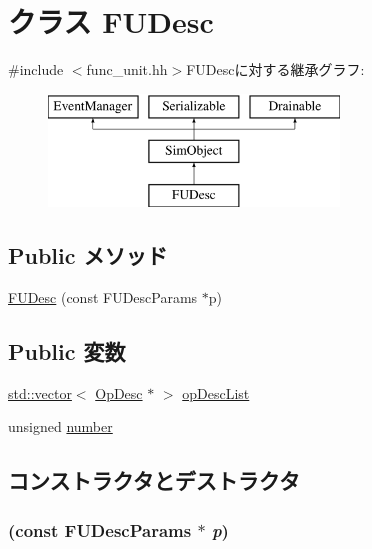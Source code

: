 \hypertarget{classFUDesc}{
\section{クラス FUDesc}
\label{classFUDesc}
}


{\ttfamily \#include $<$func\_\-unit.hh$>$}FUDescに対する継承グラフ:\begin{figure}[H]
\begin{center}
\leavevmode
\includegraphics[height=3cm]{classFUDesc}
\end{center}
\end{figure}
\subsection*{Public メソッド}
\begin{DoxyCompactItemize}
\item 
\hyperlink{classFUDesc_acd6bbab442ecc39643c604aff2b19d0e}{FUDesc} (const FUDescParams $\ast$p)
\end{DoxyCompactItemize}
\subsection*{Public 変数}
\begin{DoxyCompactItemize}
\item 
\hyperlink{classstd_1_1vector}{std::vector}$<$ \hyperlink{classOpDesc}{OpDesc} $\ast$ $>$ \hyperlink{classFUDesc_a809cc674850ff0356936a004fbfac059}{opDescList}
\item 
unsigned \hyperlink{classFUDesc_a99cb6782c65a84255b51bea9221f5103}{number}
\end{DoxyCompactItemize}


\subsection{コンストラクタとデストラクタ}
\hypertarget{classFUDesc_acd6bbab442ecc39643c604aff2b19d0e}{
\subsubsection[{FUDesc}]{ (const FUDescParams $\ast$ {\em p})}}
\label{classFUDesc_acd6bbab442ecc39643c604aff2b19d0e}



